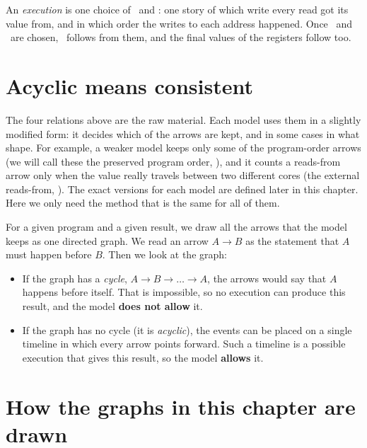 An \emph{execution} is one choice of \rf\ and \co: one story of which write every read got its value from, and in which order the writes to each address happened. Once \rf\ and \co\ are chosen, \fr\ follows from them, and the final values of the registers follow too.

\section{Acyclic means consistent}
\label{sec:acyclic}

The four relations above are the raw material. Each model uses them in a slightly modified form: it decides which of the arrows are kept, and in some cases in what shape. For example, a weaker model keeps only some of the program-order arrows (we will call these the preserved program order, \ppo), and it counts a reads-from arrow only when the value really travels between two different cores (the external reads-from, \rfe). The exact versions for each model are defined later in this chapter. Here we only need the method that is the same for all of them.

For a given program and a given result, we draw all the arrows that the model keeps as one directed graph. We read an arrow $A \to B$ as the statement that $A$ must happen before $B$. Then we look at the graph:
\begin{itemize}
  \item If the graph has a \emph{cycle}, $A \to B \to \dots \to A$, the arrows would say that $A$ happens before itself. That is impossible, so no execution can produce this result, and the model \textbf{does not allow} it.
  \item If the graph has no cycle (it is \emph{acyclic}), the events can be placed on a single timeline in which every arrow points forward. Such a timeline is a possible execution that gives this result, so the model \textbf{allows} it.
\end{itemize}

\section{How the graphs in this chapter are drawn}
\label{sec:legend}

